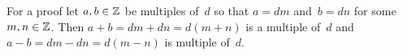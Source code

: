 \documentclass{ibl}  %
\begin{document}
\begin{problem}
\begin{exes}
\begin{answer}
  For a proof
  let $a,b\in\mathbb{Z}$ be multiples of~$d$ so that $a=dm$ and~$b=dn$ 
  for some $m,n\in\mathbb{Z}$.
  Then $a+b=dm+dn=d(m+n)$ is a multiple of~$d$
  and $a-b=dm-dn=d(m-n)$ is multiple of~$d$.    
\end{answer}

 
\end{exes}
\end{problem}
\end{document}

